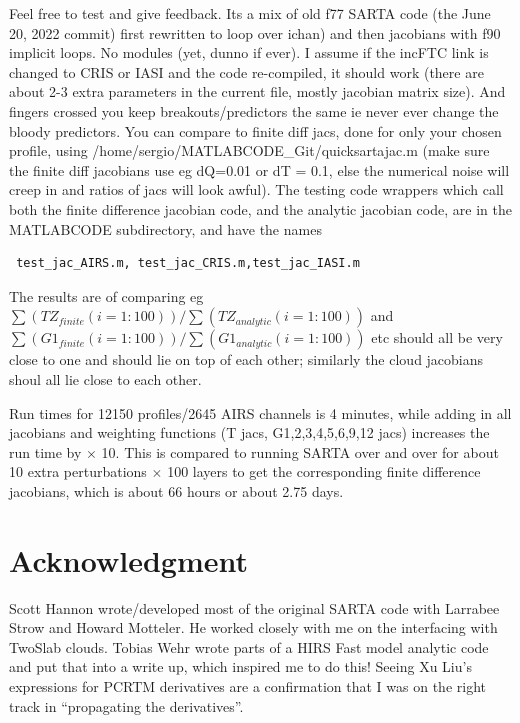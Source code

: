 \documentclass[11pt]{article}
\newcommand{\sa}{\textsf{SARTA}\xspace}
\begin{document}
Feel free to test and give feedback. Its a mix of old f77 \sa code
(the June 20, 2022 commit) first rewritten to loop over ichan) and
then jacobians with f90 implicit loops. No modules (yet, dunno if
ever). I assume if the incFTC link is changed to CRIS or IASI and the
code re-compiled, it should work (there are about 2-3 extra parameters
in the current file, mostly jacobian matrix size). And fingers crossed
you keep breakouts/predictors the same ie never ever change the bloody
predictors.  You can compare to finite diff jacs, done for only your
chosen profile, using /home/sergio/MATLABCODE\_Git/quicksartajac.m
(make sure the finite diff jacobians use eg dQ=0.01 or dT = 0.1, else
the numerical noise will creep in and ratios of jacs will look awful).
The testing code wrappers which call both the finite difference
jacobian code, and the analytic jacobian code, are in the MATLABCODE
subdirectory, and have the names 
\begin{verbatim} test_jac_AIRS.m, test_jac_CRIS.m,test_jac_IASI.m 
\end{verbatim}
The results are of comparing eg
$\sum(TZ_{finite}(i=1:100))/\sum(TZ_{analytic}(i=1:100))$ and
$\sum(G1_{finite}(i=1:100))/\sum(G1_{analytic}(i=1:100))$ etc should all
be very close to one and should lie on top of each other; similarly
the cloud jacobians shoul all lie close to each other.

Run times for 12150 profiles/2645 AIRS channels is 4 minutes, while
adding in all jacobians and weighting functions (T jacs,
G1,2,3,4,5,6,9,12 jacs) increases the run time by $\times$ 10. This is
compared to running \sa over and over for about 10 extra
perturbations $\times$ 100 layers to get the corresponding finite
difference jacobians, which is about 66 hours or about 2.75 days.

\section{Acknowledgment}
Scott Hannon wrote/developed most of the original \sa code with
Larrabee Strow and Howard Motteler. He worked closely with me on the
interfacing with TwoSlab clouds. Tobias Wehr wrote parts of a HIRS
Fast model analytic code and put that into a write up, which inspired
me to do this! Seeing Xu Liu's expressions for PCRTM derivatives are a
confirmation that I was on the right track in ``propagating the
derivatives''.



\end{document}
